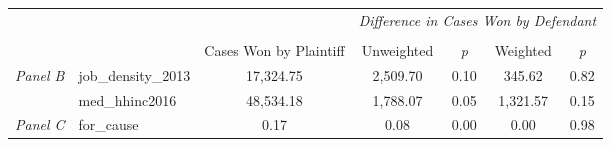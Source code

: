 \begin{tabular}{llccccc}
\toprule
 &  & \textit{} & \multicolumn{4}{c}{\textit{Difference in Cases Won by Defendant}} \\
\cline{4-7}
\\
 &  & Cases Won by Plaintiff & Unweighted & \emph{p} & Weighted & \emph{p} \\
\midrule
\multirow[c]{2}{3cm}{\textit{Panel B}} & job_density_2013 & 17,324.75 & 2,509.70 & 0.10 & 345.62 & 0.82 \\
 & med_hhinc2016 & 48,534.18 & 1,788.07 & 0.05 & 1,321.57 & 0.15 \\
\cline{1-7}
\textit{Panel C} & for_cause & 0.17 & 0.08 & 0.00 & 0.00 & 0.98 \\
\cline{1-7}
\bottomrule
\end{tabular}
